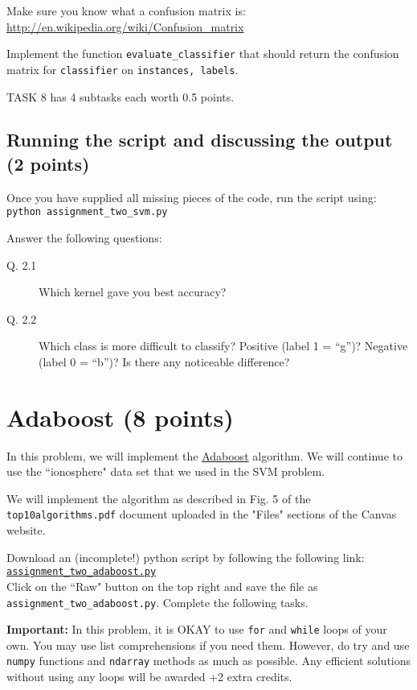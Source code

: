 \documentclass{article}
\begin{document}
Make sure you know what a confusion matrix is:
\url{http://en.wikipedia.org/wiki/Confusion\_matrix}

Implement the function {\tt evaluate\_classifier} that should return the confusion matrix for {\tt classifier} on {\tt instances, labels}.

TASK 8 has 4 subtasks each worth 0.5 points.

\subsection{Running the script and discussing the output (2 points)}

Once you have supplied all missing pieces of the code, run the script using:\\
{\tt python assignment\_two\_svm.py}

Answer the following questions:
\begin{description}
\item[Q. 2.1]
Which kernel gave you best accuracy?
\item[Q. 2.2]
Which class is more difficult to classify? Positive (label 1 = ``g'')? Negative (label 0 = ``b'')? Is there any noticeable difference?
\end{description}


\section{Adaboost (8 points)}

In this problem, we will implement the \href{http://en.wikipedia.org/wiki/AdaBoost}{Adaboost} algorithm.
We will continue to use the ``ionosphere" data set that we used in the SVM problem.

We will implement the algorithm as described in Fig. 5 of the {\tt top10algorithms.pdf} document uploaded in the "Files" sections 
of the Canvas website.

Download an (incomplete!) python script by following the following
link:\\
\href{https://github.com/ambujtewari/stats607a-fall2017/blob/master/homeworks/assignment\_two\_adaboost.py}{\tt assignment\_two\_adaboost.py} \\
Click on the ``Raw" button on the top right and save the file as {\tt assignment\_two\_adaboost.py}.
Complete the following tasks.

{\bf Important:} In this problem, it is OKAY to use {\tt for} and {\tt while} loops of your own. You may use list comprehensions if you need them.
However, do try and use {\tt numpy} functions and {\tt ndarray} methods as much as possible. Any efficient solutions without using any loops
will be awarded +2 extra credits.
\end{document}
